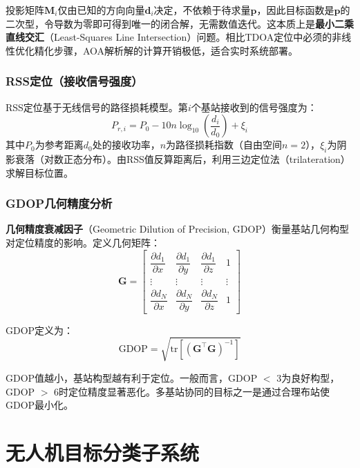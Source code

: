 \documentclass[12pt, a4paper]{article}
\begin{document}
投影矩阵$\bm{M}_i$仅由已知的方向向量$\bm{d}_i$决定，不依赖于待求量$\bm{p}$，因此目标函数是$\bm{p}$的二次型，令导数为零即可得到唯一的闭合解，无需数值迭代。这本质上是\textbf{最小二乘直线交汇}（Least-Squares Line Intersection）问题。相比TDOA定位中必须的非线性优化精化步骤，AOA解析解的计算开销极低，适合实时系统部署。

\subsubsection{RSS定位（接收信号强度）}

RSS定位基于无线信号的路径损耗模型。第$i$个基站接收到的信号强度为：
\begin{equation}
  P_{r,i} = P_0 - 10n\log_{10}\!\left(\frac{d_i}{d_0}\right) + \xi_i
  \label{eq:rss_model}
\end{equation}
其中$P_0$为参考距离$d_0$处的接收功率，$n$为路径损耗指数（自由空间$n=2$），$\xi_i$为阴影衰落（对数正态分布）。由RSS值反算距离后，利用三边定位法（trilateration）求解目标位置。

\subsubsection{GDOP几何精度分析}

\textbf{几何精度衰减因子}（Geometric Dilution of Precision, GDOP）衡量基站几何构型对定位精度的影响。定义几何矩阵：
\begin{equation}
  \bm{G} = \begin{bmatrix}
    \dfrac{\partial d_1}{\partial x} & \dfrac{\partial d_1}{\partial y} & \dfrac{\partial d_1}{\partial z} & 1 \\[6pt]
    \vdots & \vdots & \vdots & \vdots \\[2pt]
    \dfrac{\partial d_N}{\partial x} & \dfrac{\partial d_N}{\partial y} & \dfrac{\partial d_N}{\partial z} & 1
  \end{bmatrix}
  \label{eq:gdop_G}
\end{equation}

GDOP定义为：
\begin{equation}
  \mathrm{GDOP} = \sqrt{\mathrm{tr}\!\left[\left(\bm{G}^\top\bm{G}\right)^{-1}\right]}
  \label{eq:gdop}
\end{equation}

GDOP值越小，基站构型越有利于定位。一般而言，GDOP $<$ 3为良好构型，GDOP $>$ 6时定位精度显著恶化。多基站协同的目标之一是通过合理布站使GDOP最小化。

\section{无人机目标分类子系统}
\end{document}
